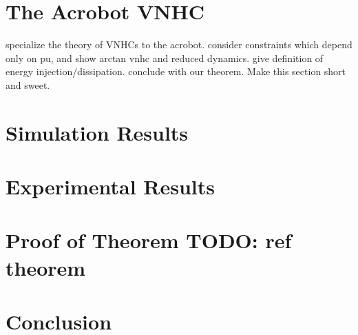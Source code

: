 \documentclass[journal,twoside,web]{ieeecolor}
\begin{document}
\section{The Acrobot VNHC}\label{sec:acrobot}
specialize the theory of VNHCs to the acrobot. consider constraints which depend
only on pu, and show arctan vnhc and reduced dynamics. 
give definition of energy injection/dissipation. conclude with our
theorem. Make this section short and sweet.

\section{Simulation Results}\label{sec:simulations}

\section{Experimental Results}\label{sec:experiments}

\section{Proof of Theorem \textbf{TODO: ref theorem}}\label{sec:proof}

\section{Conclusion}\label{sec:conclusion}



\end{document}

